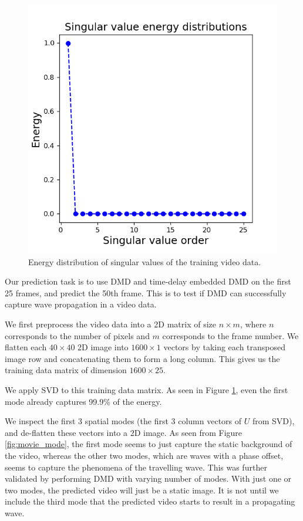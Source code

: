 \documentclass[letterpaper, 10 pt, conference]{ieeeconf}  %
\begin{document}
\begin{figure}[htb] 
\centering
\includegraphics[width=0.97\columnwidth]{images/movie_energy.png}
\caption{Energy distribution of singular values of the training video data.}
\label{fig:movie_energy}
\end{figure}

Our prediction task is to use DMD and time-delay embedded DMD on the first 25 frames, and predict the 50th frame. This is to test if DMD can successfully capture wave propagation in a video data.

We first preprocess the video data into a 2D matrix of size $n \times m$, where $n$ corresponds to the number of pixels and $m$ corresponds to the frame number. We flatten each $40 \times 40$ 2D image into $1600 \times 1$ vectors by taking each transposed image row and concatenating them to form a long column. This gives us the training data matrix of dimension $1600 \times 25$.

We apply SVD to this training data matrix. As seen in Figure \ref{fig:movie_energy}, even the first mode already captures 99.9\% of the energy.

We inspect the first 3 spatial modes (the first 3 column vectors of $U$ from SVD), and de-flatten these vectors into a 2D image. As seen from Figure \ref{fig:movie_mode}, the first mode seems to just capture the static background of the video, whereas the other two modes, which are waves with a phase offset, seems to capture the phenomena of the travelling wave. This was further validated by performing DMD with varying number of modes. With just one or two modes, the predicted video will just be a static image. It is not until we include the third mode that the predicted video starts to result in a propagating wave.
\end{document}
